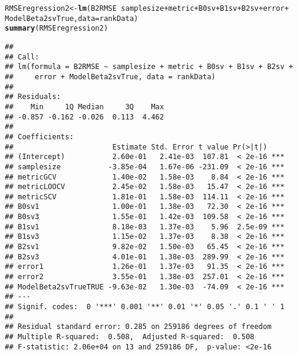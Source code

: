 \documentclass{article}\usepackage[]{graphicx}\usepackage[]{color}
\makeatletter
\newcommand{\hlopt}[1]{\textcolor[rgb]{0,0,0}{#1}}%
\newcommand{\hlstd}[1]{\textcolor[rgb]{0.345,0.345,0.345}{#1}}%
\newcommand{\hlkwb}[1]{\textcolor[rgb]{0.69,0.353,0.396}{#1}}%
\newcommand{\hlkwc}[1]{\textcolor[rgb]{0.333,0.667,0.333}{#1}}%
\newcommand{\hlkwd}[1]{\textcolor[rgb]{0.737,0.353,0.396}{\textbf{#1}}}%
\newenvironment{kframe}{%
 \def\at@end@of@kframe{}%
 \ifinner\ifhmode%
  \def\at@end@of@kframe{\end{minipage}}%
  \begin{minipage}{\columnwidth}%
 \fi\fi%
 \def\FrameCommand##1{\hskip\@totalleftmargin \hskip-\fboxsep
 \colorbox{shadecolor}{##1}\hskip-\fboxsep
     \hskip-\linewidth \hskip-\@totalleftmargin \hskip\columnwidth}%
 \MakeFramed {\advance\hsize-\width
   \@totalleftmargin\z@ \linewidth\hsize
   \@setminipage}}%
 {\par\unskip\endMakeFramed%
 \at@end@of@kframe}
\newenvironment{knitrout}{}{} %
\makeatother
\begin{document}
\begin{knitrout}
\color{fgcolor}\begin{kframe}
\begin{alltt}
\hlstd{RMSEregression2} \hlkwb{<-} \hlkwd{lm}\hlstd{(B2RMSE} \hlopt{~} \hlstd{samplesize} \hlopt{+} \hlstd{metric} \hlopt{+} \hlstd{B0sv} \hlopt{+} \hlstd{B1sv} \hlopt{+} \hlstd{B2sv} \hlopt{+} \hlstd{error} \hlopt{+}
    \hlstd{ModelBeta2svTrue,} \hlkwc{data} \hlstd{= rankData)}
\hlkwd{summary}\hlstd{(RMSEregression2)}
\end{alltt}
\begin{verbatim}
## 
## Call:
## lm(formula = B2RMSE ~ samplesize + metric + B0sv + B1sv + B2sv + 
##     error + ModelBeta2svTrue, data = rankData)
## 
## Residuals:
##    Min     1Q Median     3Q    Max 
## -0.857 -0.162 -0.026  0.113  4.462 
## 
## Coefficients:
##                       Estimate Std. Error t value Pr(>|t|)    
## (Intercept)           2.60e-01   2.41e-03  107.81  < 2e-16 ***
## samplesize           -3.85e-04   1.67e-06 -231.09  < 2e-16 ***
## metricGCV             1.40e-02   1.58e-03    8.84  < 2e-16 ***
## metricLOOCV           2.45e-02   1.58e-03   15.47  < 2e-16 ***
## metricSCV             1.81e-01   1.58e-03  114.11  < 2e-16 ***
## B0sv1                 1.00e-01   1.38e-03   72.30  < 2e-16 ***
## B0sv3                 1.55e-01   1.42e-03  109.58  < 2e-16 ***
## B1sv1                 8.18e-03   1.37e-03    5.96  2.5e-09 ***
## B1sv3                 1.15e-02   1.37e-03    8.38  < 2e-16 ***
## B2sv1                 9.82e-02   1.50e-03   65.45  < 2e-16 ***
## B2sv3                 4.01e-01   1.38e-03  289.99  < 2e-16 ***
## error1                1.26e-01   1.37e-03   91.35  < 2e-16 ***
## error2                3.55e-01   1.38e-03  257.01  < 2e-16 ***
## ModelBeta2svTrueTRUE -9.63e-02   1.30e-03  -74.09  < 2e-16 ***
## ---
## Signif. codes:  0 '***' 0.001 '**' 0.01 '*' 0.05 '.' 0.1 ' ' 1
## 
## Residual standard error: 0.285 on 259186 degrees of freedom
## Multiple R-squared:  0.508,	Adjusted R-squared:  0.508 
## F-statistic: 2.06e+04 on 13 and 259186 DF,  p-value: <2e-16
\end{verbatim}
\end{kframe}
\end{knitrout}
\end{document}
